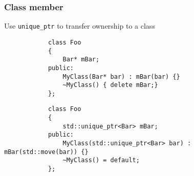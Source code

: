 \documentclass{beamer}
\begin{document}
\begin{frame}[fragile]
\frametitle{Class member}
	Use \texttt{unique\_ptr} to transfer ownership to a class
	\begin{example}
		\begin{lstlisting}
			class Foo
			{
				Bar* mBar;
			public:
				MyClass(Bar* bar) : mBar(bar) {}
				~MyClass() { delete mBar;}
			};
		\end{lstlisting}
	\end{example}
    \begin{example}
		\begin{lstlisting}
			class Foo
			{
				std::unique_ptr<Bar> mBar;
			public:
				MyClass(std::unique_ptr<Bar> bar) : mBar(std::move(bar)) {}
				~MyClass() = default;
			};
		\end{lstlisting}
	\end{example}
\end{frame}
\end{document}
